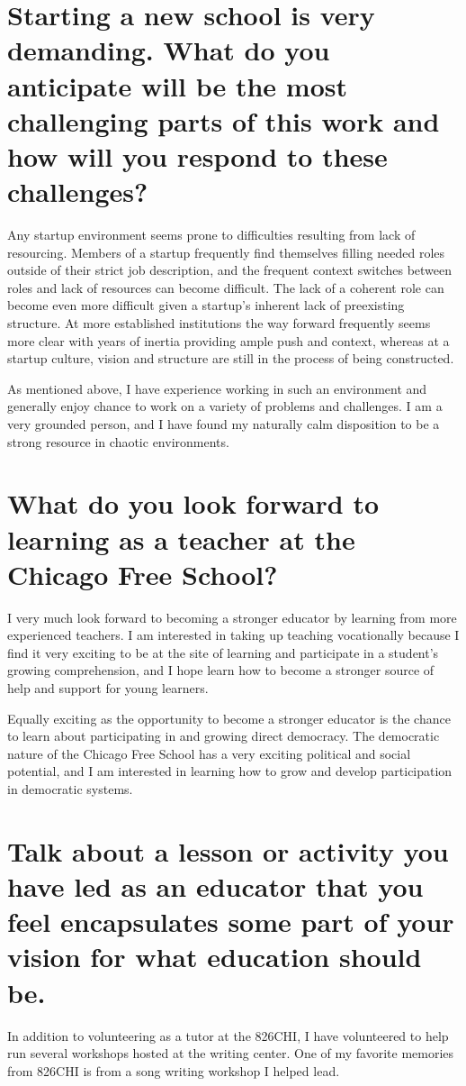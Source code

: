 \documentclass[oneside]{memoir}
\begin{document}
\section*{Starting a new school is very demanding.  What do you
  anticipate will be the most challenging parts of this work and how
  will you respond to these challenges?}
Any startup environment seems prone to difficulties resulting from
lack of resourcing.
Members of a startup frequently find themselves filling needed roles
outside of their strict job description, and the frequent context
switches between roles and lack of resources can become difficult.
The lack of a coherent role can become even more difficult 
given a startup's inherent lack of preexisting structure.
At more established institutions the way forward frequently seems
more clear with years of inertia providing ample push and context,
whereas at a startup culture, vision and structure are still in the
process of being constructed.

As mentioned above, I have experience working in such an environment
and generally enjoy chance to work on a variety of problems and
challenges. 
I am a very grounded person, and I have found my naturally calm
disposition to be a strong resource in chaotic environments.

\section*{What do you look forward to learning as a teacher at the
  Chicago Free School?}
I very much look forward to becoming a stronger educator by learning
from more experienced teachers.
I am interested in taking up teaching vocationally because I find it
very exciting to be at the site of learning and participate in a
student's growing comprehension, and I hope learn how to become a
stronger source of help and support for young learners. 

Equally exciting as the opportunity to become a stronger educator is
the chance to learn about participating in and growing direct
democracy.
The democratic nature of the Chicago Free School has a very exciting
political and social potential, and I am interested in learning how to
grow and develop participation in democratic systems.

\section*{Talk about a lesson or activity you have led as an educator
  that you feel encapsulates some part of your vision for what
  education should be.}
In addition to volunteering as a tutor at the 826CHI, I have
volunteered to help run several workshops hosted at the writing
center.
One of my favorite memories from 826CHI is from a song writing
workshop I helped lead.
\end{document}
